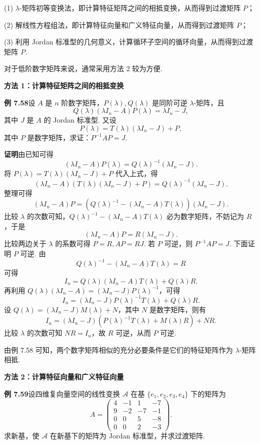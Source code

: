 \documentclass[UTF8,12pt,a4paper,fontset=fandol]{ctexart}
\begin{document}
(1) $\lambda$-矩阵初等变换法，即计算特征矩阵之间的相抵变换，从而得到过渡矩阵 $P$；

(2) 解线性方程组法，即计算特征向量和广义特征向量，从而得到过渡矩阵 $P$；

(3) 利用 Jordan 标准型的几何意义，计算循环子空间的循环向量，从而得到过渡矩阵 $P$.

对于低阶数字矩阵来说，通常采用方法 2 较为方便.

\noindent\textbf{方法 1：计算特征矩阵之间的相抵变换}

\noindent\textbf{例 7.58}\quad 设 $A$ 是 $n$ 阶数字矩阵，$P(\lambda),Q(\lambda)$ 是同阶可逆 $\lambda$-矩阵，且
\[
Q(\lambda)(\lambda I_n-A)P(\lambda)=\lambda I_n-J,
\]
其中 $J$ 是 $A$ 的 Jordan 标准型. 又设
\[
P(\lambda)=T(\lambda)(\lambda I_n-J)+P,
\]
其中 $P$ 是数字矩阵，求证：$P^{-1}AP=J$.

\noindent\textbf{证明}\quad 由已知可得
\[
(\lambda I_n-A)P(\lambda)=Q(\lambda)^{-1}(\lambda I_n-J).
\]
将 $P(\lambda)=T(\lambda)(\lambda I_n-J)+P$ 代入上式，得
\[
(\lambda I_n-A)(T(\lambda)(\lambda I_n-J)+P)=Q(\lambda)^{-1}(\lambda I_n-J).
\]
整理可得
\[
(\lambda I_n-A)P=(Q(\lambda)^{-1}-(\lambda I_n-A)T(\lambda))(\lambda I_n-J).
\]
比较 $\lambda$ 的次数可知，$Q(\lambda)^{-1}-(\lambda I_n-A)T(\lambda)$ 必为数字矩阵，不妨记为 $R$，于是
\[
(\lambda I_n-A)P=R(\lambda I_n-J).
\]
比较两边关于 $\lambda$ 的系数可得 $P=R,AP=RJ$. 若 $P$ 可逆，则 $P^{-1}AP=J$. 下面证明 $P$ 可逆. 由
\[
Q(\lambda)^{-1}-(\lambda I_n-A)T(\lambda)=R
\]
可得
\[
I_n=Q(\lambda)(\lambda I_n-A)T(\lambda)+Q(\lambda)R.
\]
再利用 $Q(\lambda)(\lambda I_n-A)=(\lambda I_n-J)P(\lambda)^{-1}$，可得
\[
I_n=(\lambda I_n-J)P(\lambda)^{-1}T(\lambda)+Q(\lambda)R.
\]
设 $Q(\lambda)=(\lambda I_n-J)M(\lambda)+N$，其中 $N$ 是数字矩阵，则有
\[
I_n=(\lambda I_n-J)(P(\lambda)^{-1}T(\lambda)+M(\lambda)R)+NR.
\]
比较 $\lambda$ 的次数可知 $NR=I_n$，故 $R$ 可逆，从而 $P$ 可逆.

由例 7.58 可知，两个数字矩阵相似的充分必要条件是它们的特征矩阵作为 $\lambda$-矩阵相抵.

\noindent\textbf{方法 2：计算特征向量和广义特征向量}

\noindent\textbf{例 7.59}\quad 设四维复向量空间的线性变换 $\mathcal{A}$ 在基 $\{e_1,e_2,e_3,e_4\}$ 下的矩阵为
\[
A=\left(\begin{array}{rrrr}
4&-1&1&-7\\
9&-2&-7&-1\\
0&0&5&-8\\
0&0&2&-3
\end{array}\right).
\]
求新基，使 $\mathcal{A}$ 在新基下的矩阵为 Jordan 标准型，并求过渡矩阵.
\end{document}
